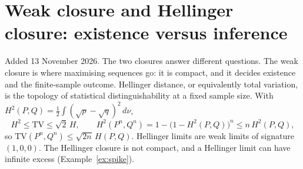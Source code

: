 \documentclass[11pt]{article}
\theoremstyle{definition}
\theoremstyle{remark}
\begin{document}
\section{Weak closure and Hellinger closure: existence versus inference}
\label{sec:hellinger}
Added 13 November 2026. The two closures answer different questions. The
weak closure is where maximising sequences go: it is compact, and it
decides existence and the finite-sample outcome. Hellinger distance, or
equivalently total variation, is the topology of statistical
distinguishability at a fixed sample size. With
$H^2(P,Q)=\frac12\int(\sqrt p-\sqrt q)^2\,d\nu$,
\[
 H^2\le\mathrm{TV}\le\sqrt2\,H,\qquad
 H^2(P^n,Q^n)=1-\bigl(1-H^2(P,Q)\bigr)^n\le n\,H^2(P,Q),
\]
so $\mathrm{TV}(P^n,Q^n)\le\sqrt{2n}\,H(P,Q)$. Hellinger limits are weak
limits of signature $(1,0,0)$. The Hellinger closure is not compact, and a
Hellinger limit can have infinite excess (Example~\ref{ex:spike}).
\end{document}
